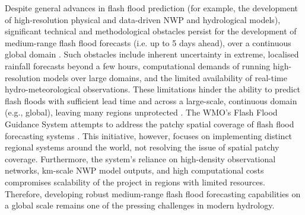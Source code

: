 Despite  general advances in flash flood prediction (for example, the development of high-resolution physical and data-driven NWP and hydrological models), significant technical and methodological obstacles persist for the development of medium-range flash flood forecasts (i.e. up to 5 days ahead), over a continuous global domain \citep{Zanchetta_2020}. Such obstacles include inherent uncertainty in extreme, localised rainfall forecasts beyond a few hours, computational demands of running high-resolution models over large domains, and the limited availability of real-time hydro-meteorological observations. These limitations hinder the ability to predict flash floods with sufficient lead time and across a large-scale, continuous domain (e.g., global), leaving many regions unprotected \citep{AlRawas_2024}. The WMO's Flash Flood Guidance System attempts to address the patchy spatial coverage of flash flood forecasting systems \citep{Georgakakos_2022}. This initiative, however, focuses on implementing distinct regional systems around the world, not resolving the issue of spatial patchy coverage. Furthermore, the system's reliance on high-density observational networks, km-scale NWP model outputs, and high computational costs compromises scalability of the project in regions with limited resources. Therefore, developing robust medium-range flash flood forecasting capabilities on a global scale remains one of the pressing challenges in modern hydrology.

